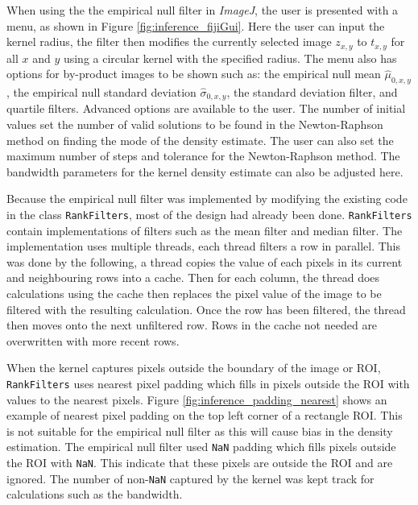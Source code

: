 When using the the empirical null filter in \emph{ImageJ}, the user is presented with a menu, as shown in Figure \ref{fig:inference_fijiGui}. Here the user can input the kernel radius, the filter then modifies the currently selected image $z_{x,y}$ to $t_{x,y}$ for all $x$ and $y$ using a circular kernel with the specified radius. The menu also has options for by-product images to be shown such as: the empirical null mean $\widehat{\mu}_{0,x,y}$, the empirical null standard deviation $\widehat{\sigma}_{0,x,y}$, the standard deviation filter, and quartile filters. Advanced options are available to the user. The number of initial values set the number of valid solutions to be found in the Newton-Raphson method on finding the mode of the density estimate. The user can also set the maximum number of steps and tolerance for the Newton-Raphson method. The bandwidth parameters for the kernel density estimate can also be adjusted here.

Because the empirical null filter was implemented by modifying the existing code in the class \texttt{RankFilters}, most of the design had already been done. \texttt{RankFilters} contain implementations of filters such as the mean filter and median filter. The implementation uses multiple threads, each thread filters a row in parallel. This was done by the following, a thread copies the value of each pixels in its current and neighbouring rows into a cache. Then for each column, the thread does calculations using the cache then replaces the pixel value of the image to be filtered with the resulting calculation. Once the row has been filtered, the thread then moves onto the next unfiltered row. Rows in the cache not needed are overwritten with more recent rows.

When the kernel captures pixels outside the boundary of the image or ROI, \texttt{RankFilters} uses nearest pixel padding which fills in pixels outside the ROI with values to the nearest pixels. Figure \ref{fig:inference_padding_nearest} shows an example of nearest pixel padding on the top left corner of a rectangle ROI. This is not suitable for the empirical null filter as this will cause bias in the density estimation. The empirical null filter used \texttt{NaN} padding which fills pixels outside the ROI with \texttt{NaN}. This indicate that these pixels are outside the ROI and are ignored. The number of non-\texttt{NaN} captured by the kernel was kept track for calculations such as the bandwidth.

